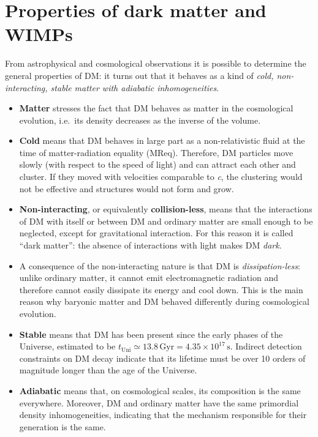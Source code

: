 \section{Properties of dark matter and WIMPs} \label{properties}

From astrophysical and cosmological observations it is possible to determine the general properties of DM: it turns out that it behaves as a kind of \emph{cold, non-interacting, stable matter with adiabatic inhomogeneities}.

\begin{itemize}
    \item \textbf{Matter} stresses the fact that DM behaves as matter in the cosmological evolution, i.e.\ its density decreases as the inverse of the volume.
   
    \item \textbf{Cold} means that DM behaves in large part as a non-relativistic fluid at the time of matter-radiation equality (MReq). Therefore, DM particles move slowly (with respect to the speed of light) and can attract each other and cluster. If they moved with velocities comparable to \emph{c}, the clustering would not be effective and structures would not form and grow.
   
    \item \textbf{Non-interacting}, or equivalently \textbf{collision-less}, means that the interactions of DM with itself or between DM and ordinary matter are small enough to be neglected, except for gravitational interaction. For this reason it is called ``dark matter'': the absence of interactions with light makes DM \emph{dark}.
    
    \item A consequence of the non-interacting nature is that DM is \emph{dissipation-less}: unlike ordinary matter, it cannot emit electromagnetic radiation and therefore cannot easily dissipate its energy and cool down. This is the main reason why baryonic matter and DM behaved differently during cosmological evolution.
    
    \item \textbf{Stable} means that DM has been present since the early phases of the Universe, estimated to be $t_{\mathrm{Uni}} \simeq 13.8\,\mathrm{Gyr} = 4.35 \times 10^{17}\,\mathrm{s}$. Indirect detection constraints on DM decay indicate that its lifetime must be over 10 orders of magnitude longer than the age of the Universe.
    
    \item \textbf{Adiabatic} means that, on cosmological scales, its composition is the same everywhere. Moreover, DM and ordinary matter have the same primordial density inhomogeneities, indicating that the mechanism responsible for their generation is the same.
    
\end{itemize}

